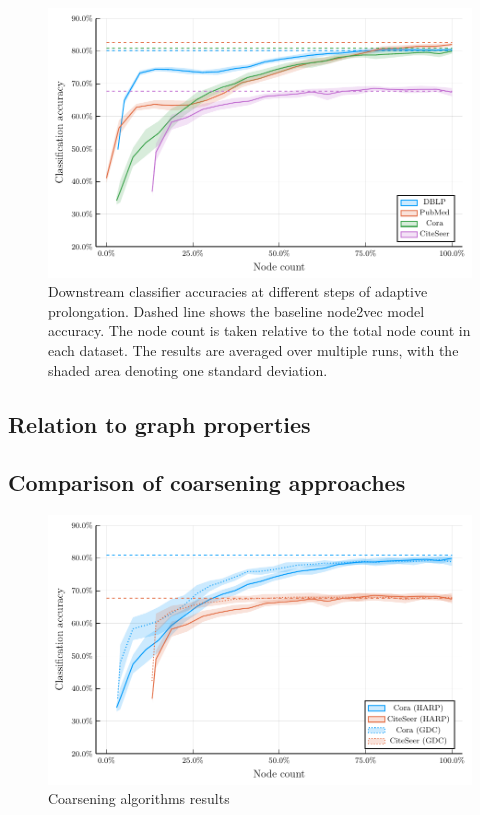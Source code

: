 \begin{figure}
  \centering
  \includegraphics[width = \linewidth]{images/adaptive-coarsening/adaptive-coarsening.pdf}
  \caption{Downstream classifier accuracies at different steps of adaptive prolongation. Dashed line shows the baseline node2vec model accuracy. The node count is taken relative to the total node count in each dataset. The results are averaged over multiple runs, with the shaded area denoting one standard deviation.}
  \label{fig:adaptive-coarsening}
\end{figure}

\subsection{Relation to graph properties}


\subsection{Comparison of coarsening approaches}

\begin{figure}
  \centering
  \includegraphics[width=\linewidth]{images/coarsening-algorithms/coarsening-algorithms.pdf}
  \caption{Coarsening algorithms results}
  \label{fig:coarsening-algorithms}
\end{figure}
